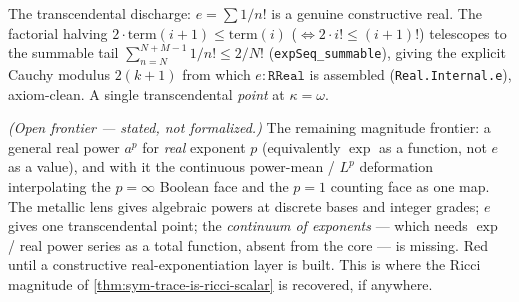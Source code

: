 \begin{theorem}\label{thm:euler-e-internal-real}\leanok{}
The transcendental discharge: $e=\sum 1/n!$ is a genuine constructive real. The factorial halving
$2\cdot\mathrm{term}(i{+}1)\le\mathrm{term}(i)$ ($\Leftrightarrow 2\cdot i! \le (i{+}1)!$) telescopes to
the summable tail $\sum_{n=N}^{N+M-1}1/n! \le 2/N!$ (\texttt{expSeq\_summable}), giving the explicit
Cauchy modulus $2(k{+}1)$ from which $e:\texttt{RReal}$ is assembled (\texttt{Real.Internal.e}),
axiom-clean. A single transcendental \emph{point} at $\kappa=\omega$.
\end{theorem}

\begin{theorem}\label{thm:continuous-exponent-deformation}\notready{}
\emph{(Open frontier --- stated, not formalized.)} The remaining magnitude frontier: a general real
power $a^p$ for \emph{real} exponent $p$ (equivalently $\exp$ as a function, not $e$ as a value), and
with it the continuous power-mean / $L^p$ deformation interpolating the $p=\infty$ Boolean face and the
$p=1$ counting face as one map. The metallic lens gives algebraic powers at discrete bases and integer
grades; $e$ gives one transcendental point; the \emph{continuum of exponents} --- which needs $\exp$ /
real power series as a total function, absent from the core --- is missing. Red until a constructive
real-exponentiation layer is built. This is where the Ricci magnitude of
\cref{thm:sym-trace-is-ricci-scalar} is recovered, if anywhere.
\end{theorem}

